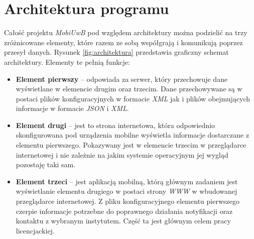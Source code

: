 \documentclass{iiuwb}
\begin{document}
\section{Architektura programu}
Całość projektu \textit{MobiUwB} pod względem architektury można podzielić na trzy zróżnicowane elementy, które razem ze sobą współgrają i komunikują poprzez przesył danych. Rysunek \ref{fig:architektura} przedstawia graficzny schemat architektury. Elementy te pełnią funkcje:
\begin{itemize}
\item \textbf{Element pierwszy} -- odpowiada za serwer, który przechowuje dane wyświetlane w elemencie drugim oraz trzecim. Dane przechowywane są w postaci plików konfiguracyjnych w formacie \textit{XML} jak i plików obejmujących informacje w formacie \textit{JSON} i \textit{XML}.
\item \textbf{Element drugi} -- jest to strona internetowa, która odpowiednio skonfigurowana pod urządzenia mobilne wyświetla informacje dostarczane z elementu pierwszego. Pokazywany jest w elemencie trzecim w przeglądarce internetowej i nie zależnie na jakim systemie operacyjnym jej wygląd pozostaję taki sam. 
\item \textbf{Element trzeci} -- jest aplikacją mobilną, którą głównym zadaniem jest wyświetlanie elementu drugiego w postaci strony \textit{WWW} w wbudowanej przeglądarce internetowej. Z pliku konfiguracyjnego elementu pierwszego czerpie informacje potrzebne do poprawnego działania notyfikacji oraz kontaktu z wybranym instytutem. Część ta jest głównym celem pracy licencjackiej.
\end{itemize}
\end{document}
